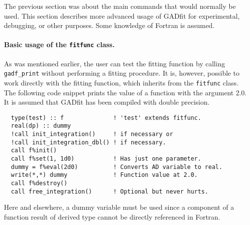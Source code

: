 \documentclass{article}
\begin{document}
The previous section was about the main commands that would normally be used. This section describes more advanced usage of GADfit for experimental, debugging, or other purposes. Some knowledge of Fortran is assumed.

\paragraph{Basic usage of the \texttt{fitfunc} class.} As was mentioned earlier, the user can test the fitting function by calling \verb+gadf_print+ without performing a fitting procedure. It is, however, possible to work directly with the fitting function, which inherits from the \verb+fitfunc+ class. The following code snippet prints the value of a function with the argument 2.0. It is assumed that GADfit has been compiled with double precision.
\begin{verbatim}
  type(test) :: f              ! 'test' extends fitfunc.
  real(dp) :: dummy
  !call init_integration()     ! if necessary or
  !call init_integration_dbl() ! if necessary.
  call f%init()
  call f%set(1, 1d0)           ! Has just one parameter.
  dummy = f%eval(2d0)          ! Converts AD variable to real.
  write(*,*) dummy             ! Function value at 2.0.
  call f%destroy()
  call free_integration()      ! Optional but never hurts.
\end{verbatim}
Here and elsewhere, a dummy variable must be used since a component of a function result of derived type cannot be directly referenced in Fortran.
\end{document}
